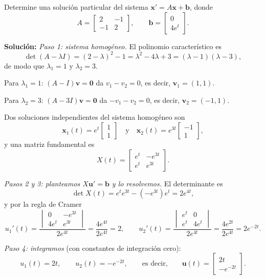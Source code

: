 \begin{example}\label{ex:vp-part}
Determine una soluci\'on particular del sistema $\mathbf x'=A\mathbf x+\mathbf b$, donde
\[
A = \begin{bmatrix} 2 & -1 \\ -1 & 2 \end{bmatrix}, \qquad \mathbf{b} = \begin{bmatrix} 0 \\ 4e^t \end{bmatrix}.
\]

\textbf{Soluci\'on:} \emph{Paso 1: sistema homog\'eneo.} El polinomio caracter\'istico es
\[
\det(A - \lambda I) = (2-\lambda)^2 - 1 = \lambda^2 - 4\lambda + 3 = (\lambda - 1)(\lambda - 3),
\]
de modo que $\lambda_1 = 1$ y $\lambda_2 = 3$.

Para $\lambda_1 = 1$: $(A - I)\mathbf{v}=\mathbf 0$ da $v_1 - v_2 = 0$, es decir, $\mathbf{v}_1 = (1,1)$.

Para $\lambda_2 = 3$: $(A - 3I)\mathbf{v}=\mathbf 0$ da $-v_1 - v_2 = 0$, es decir, $\mathbf{v}_2 = (-1,1)$.

Dos soluciones independientes del sistema homog\'eneo son
\[
\mathbf{x}_1(t) = e^t \begin{bmatrix} 1 \\ 1 \end{bmatrix} \quad \text{y} \quad \mathbf{x}_2(t) = e^{3t} \begin{bmatrix} -1 \\ 1 \end{bmatrix},
\]
y una matriz fundamental es
\[
X(t) = \begin{bmatrix} e^t & -e^{3t} \\ e^t & e^{3t} \end{bmatrix}.
\]

\emph{Pasos 2 y 3: planteamos $X\mathbf{u}'=\mathbf b$ y lo resolvemos.} El determinante es
\[
\det X(t) = e^t e^{3t} - (-e^{3t})e^t = 2e^{4t},
\]
y por la regla de Cramer
\[
u_1'(t) = \frac{\begin{vmatrix} 0 & -e^{3t} \\ 4e^t & e^{3t} \end{vmatrix}}{2e^{4t}} = \frac{4e^{4t}}{2e^{4t}} = 2, \qquad
u_2'(t) = \frac{\begin{vmatrix} e^t & 0 \\ e^t & 4e^t \end{vmatrix}}{2e^{4t}} = \frac{4e^{2t}}{2e^{4t}} = 2e^{-2t}.
\]

\emph{Paso 4: integramos} (con constantes de integraci\'on cero):
\[
u_1(t) = 2t, \qquad u_2(t) = -e^{-2t}, \qquad \text{es decir,} \qquad \mathbf{u}(t) = \begin{bmatrix} 2t \\ -e^{-2t} \end{bmatrix}.
\]


\end{example}

